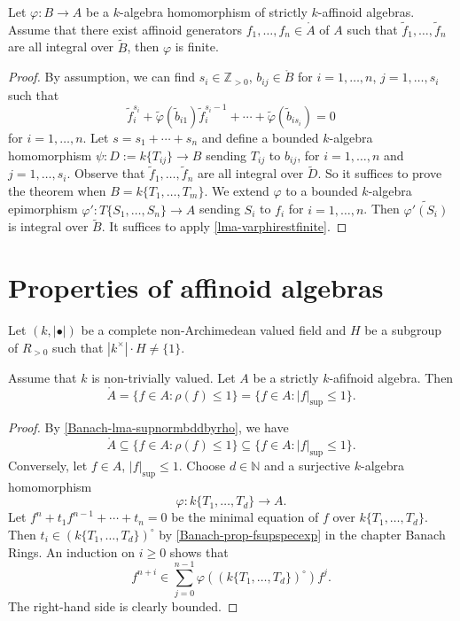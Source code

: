 \begin{lemma}\label{lma-reductionfiniteimplyfinite}
    Let $\varphi:B\rightarrow A$ be a $k$-algebra homomorphism of strictly $k$-affinoid algebras. Assume that there exist affinoid generators $f_1,\ldots,f_n\in \mathring{A}$ of $A$ such that $\tilde{f}_1,\ldots,\tilde{f}_n$ are all integral over $\tilde{B}$, then $\varphi$ is finite.
\end{lemma}
\begin{proof}
    By assumption, we can find $s_i\in \mathbb{Z}_{>0}$, $b_{ij}\in \mathring{B}$ for $i=1,\ldots,n$, $j=1,\ldots,s_i$ such that
    \[
        \tilde{f}_i^{s_i}+\tilde{\varphi}(\tilde{b}_{i1}) \tilde{f}_i^{s_i-1}+\cdots+\tilde{\varphi}(\tilde{b}_{is_i})=0 
    \]
    for $i=1,\ldots,n$. Let $s=s_1+\cdots+s_n$ and define a bounded $k$-algebra homomorphism $\psi:D:=k\{T_{ij}\}\rightarrow B$ sending $T_{ij}$ to $b_{ij}$, for $i=1,\ldots,n$ and $j=1,\ldots,s_i$. Observe that $\tilde{f}_1,\ldots,\tilde{f}_n$ are all integral over $\tilde{D}$. So it suffices to prove the theorem when $B=k\{T_1,\ldots,T_m\}$. We extend $\varphi$ to a bounded $k$-algebra epimorphism $\varphi':T\{S_1,\ldots,S_n\}\rightarrow A$ sending $S_i$ to $f_i$ for $i=1,\ldots,n$.  Then $\tilde{\varphi'(S_i)}$ is integral over $\tilde{B}$. It suffices to apply \cref{lma-varphirestfinite}.
\end{proof}

\section{Properties of affinoid algebras}
Let $(k,|\bullet|)$ be a complete non-Archimedean valued field and $H$ be a subgroup of $R_{>0}$ such that $|k^{\times}|\cdot H\neq \{1\}$.

\begin{proposition}\label{prop-powerbddinstrictlyaff}
    Assume that $k$ is non-trivially valued. Let $A$ be a strictly $k$-afifnoid algebra. Then
    \[
        \mathring{A}=\{f\in A: \rho(f)\leq 1\}=\{f\in A: |f|_{\sup}\leq 1\}.    
    \]
\end{proposition}
\begin{proof}
    By \cref{Banach-lma-supnormbddbyrho}, we have 
    \[
        \mathring{A}\subseteq \{f\in A: \rho(f)\leq 1\}\subseteq \{f\in A: |f|_{\sup}\leq 1\}. 
    \]
    Conversely, let $f\in A$, $|f|_{\sup}\leq 1$. Choose $d\in \mathbb{N}$ and a surjective $k$-algebra homomorphism
    \[
        \varphi:k\{T_1,\ldots,T_d\}\rightarrow A.  
    \]
    Let $f^n+t_1f^{n-1}+\cdots+t_n=0$ be the minimal equation of $f$ over $k\{T_1,\ldots,T_d\}$. Then $t_i\in (k\{T_1,\ldots,T_d\})^{\circ}$ by \cref{Banach-prop-fsupspecexp} in the chapter Banach Rings. An induction on $i\geq 0$ shows that
    \[
        f^{n+i}\in \sum_{j=0}^{n-1}\varphi\left((k\{T_1,\ldots,T_d\})^{\circ} \right)f^j.
    \]
    The right-hand side is clearly bounded.
\end{proof}

